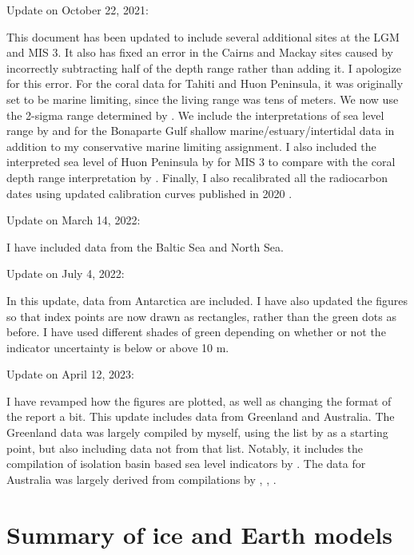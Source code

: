 \documentclass[a4paper,12pt]{article}
\begin{document}
Update on October 22, 2021:

This document has been updated to include several additional sites at the LGM and MIS 3. It also has fixed an error in the Cairns and Mackay sites caused by incorrectly subtracting half of the depth range rather than adding it. I apologize for this error. For the coral data for Tahiti and Huon Peninsula, it was originally set to be marine limiting, since the living range was tens of meters. We now use the 2-sigma range determined by \citet{HibbertEtal2016}. We include the interpretations of sea level range by \citet{IshiwaEtal2019} and \citet{YokoyamaEtal2000} for the Bonaparte Gulf shallow marine/estuary/intertidal data in addition to my conservative marine limiting assignment. I also included the interpreted sea level of Huon Peninsula by \citet{deGelderEtal2022} for MIS 3 to compare with the coral depth range interpretation by \citet{HibbertEtal2016}. Finally, I also recalibrated all the radiocarbon dates using updated calibration curves published in 2020 \citep{HeatonEtal2020,HoggEtal2020,ReimerEtal2020}.

Update on March 14, 2022:

I have included data from the Baltic Sea and North Sea.

Update on July 4, 2022:

In this update, data from Antarctica are included. I have also updated the figures so that index points are now drawn as rectangles, rather than the green dots as before. I have used different shades of green depending on whether or not the indicator uncertainty is below or above 10 m.

Update on April 12, 2023:

I have revamped how the figures are plotted, as well as changing the format of the report a bit. This update includes data from Greenland and Australia. The Greenland data was largely compiled by myself, using the list by \citet{LecavalierEtal2014} as a starting point, but also including data not from that list. Notably, it includes the compilation of isolation basin based sea level indicators by \citet{LongEtal2011}. The data for Australia was largely derived from compilations by \citet{LewisEtal2013}, \citet{SlossEtal2007}, \citet{BelperioEtal2002}.


\section{Summary of ice and Earth models}
\end{document}
